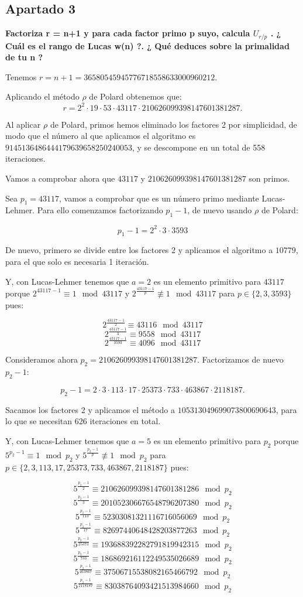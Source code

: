\documentclass[a4paper]{article}
\begin{document}
\subsection{Apartado 3}

\textbf{Factoriza r = n+1 y para cada factor primo p suyo, calcula $U_{r/p}$ . ¿ Cuál es el rango de Lucas w(n) ?. ¿ Qué deduces sobre la primalidad de tu n ?}

Tenemos $r=n+1=36580545945776718558633000960212$.

Aplicando el método $\rho$ de Polard obtenemos que:
$$r=2^2\cdot 19\cdot 53\cdot 43117\cdot 210626099398147601381287.$$

Al aplicar $\rho$ de Polard, primos hemos eliminado los factores 2 por simplicidad, de modo que el número al que aplicamos el algoritmo es $9145136486444179639658250240053$, y se descompone en un total de 558 iteraciones.

Vamos a comprobar ahora que $43117$ y $210626099398147601381287$ son primos.

Sea $p_1=43117$, vamos a comprobar que es un número primo mediante Lucas-Lehmer. Para ello comenzamos factorizando $p_1-1$, de nuevo usando $\rho$ de Polard:

$$p_1-1=2^2\cdot 3\cdot 3593$$

De nuevo, primero se divide entre los factores 2 y aplicamos el algoritmo a $10779$, para el que solo es necesaria 1 iteración.

Y, con Lucas-Lehmer tenemos que $a=2$ es un elemento primitivo para $43117$ porque $2^{43117-1}\equiv 1\mod 43117$ y $2^{\frac{43117-1}{p}}\not\equiv 1\mod 43117 $ para $p\in\{2,3,3593\}$ pues:

$$2^{\frac{43117-1}{2}}\equiv 43116\mod 43117$$
$$2^{\frac{43117-1}{3}}\equiv 9558\mod 43117$$
$$2^{\frac{43117-1}{3593}}\equiv 4096\mod 43117$$

Consideramos ahora $p_2=210626099398147601381287$. Factorizamos de nuevo $p_2-1$:

$$p_2-1=2\cdot 3\cdot 113\cdot 17\cdot 25373\cdot 733\cdot 463867\cdot 2118187.$$

Sacamos los factores 2 y aplicamos el método a $105313049699073800690643$, para lo que se necesitan 626 iteraciones en total.

Y, con Lucas-Lehmer tenemos que $a=5$ es un elemento primitivo para $p_2$ porque $5^{p_2-1}\equiv 1\mod p_2$ y $5^{\frac{p_2-1}{p}}\not\equiv 1\mod p_2 $ para $p\in\{2, 3, 113, 17, 25373, 733, 463867, 2118187\}$ pues:

$$5^{\frac{p_2-1}{2}}\equiv 210626099398147601381286 \mod p_2$$
$$5^{\frac{p_2-1}{3}}\equiv 201052306676548796207380 \mod p_2$$
$$5^{\frac{p_2-1}{113}}\equiv 52303081321116716056069 \mod p_2$$
$$5^{\frac{p_2-1}{17}}\equiv 82697440648428203877263 \mod p_2$$
$$5^{\frac{p_2-1}{25373}}\equiv 193688392282791819942315 \mod p_2$$
$$5^{\frac{p_2-1}{733}}\equiv 186869216112249535026689 \mod p_2$$
$$5^{\frac{p_2-1}{463867}}\equiv 37506715538082165466792 \mod p_2$$
$$5^{\frac{p_2-1}{2118187}}\equiv 83038764093421513984660 \mod p_2$$
\end{document}
